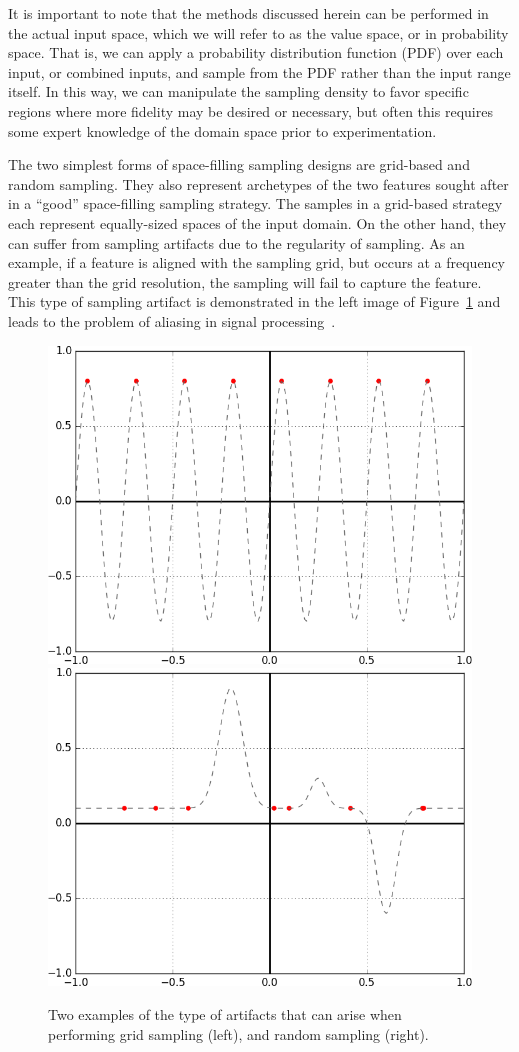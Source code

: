 It is important to note that the methods discussed herein can be performed in the actual input space, which we will refer to as the value space, or in probability space.
%
That is, we can apply a probability distribution function (PDF) over each input, or combined inputs, and sample from the PDF rather than the input range itself.
%
In this way, we can manipulate the sampling density to favor specific regions where more fidelity may be desired or necessary, but often this requires some expert knowledge of the domain space prior to experimentation.

The two simplest forms of space-filling sampling designs are grid-based and random sampling.
%
They also represent archetypes of the two features sought after in a ``good'' space-filling sampling strategy.
%
The samples in a grid-based strategy each represent equally-sized spaces of the input domain.
%
On the other hand, they can suffer from sampling artifacts due to the regularity of sampling.
%
As an example, if a feature is aligned with the sampling grid, but occurs at a frequency greater than the grid resolution, the sampling will fail to capture the feature.
%
This type of sampling artifact is demonstrated in the left image of Figure~\ref{fig:samplingArtifacts} and leads to the problem of aliasing in signal processing~\cite{Crow1977}.
%

\begin{figure}[t]
  \centering
  \includegraphics[width=.45\textwidth]{figs/chap3/sampledSine}\qquad
  \includegraphics[width=.45\textwidth]{figs/chap3/sampledGaussian}
  \caption[1D Sampling Artifacts]{Two examples of the type of artifacts that can
  arise when performing grid sampling (left), and random sampling (right).}
  \label{fig:samplingArtifacts}
\end{figure}

